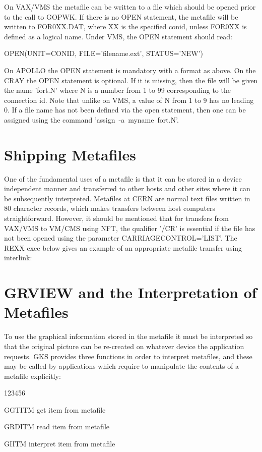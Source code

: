 On VAX/VMS the metafile can be written to a file which should be opened
prior to the call to GOPWK. If there is no OPEN statement, the metafile will
be written to FOR0XX.DAT, where XX is the specified conid, unless
FOR0XX is defined as a logical name.
Under VMS, the OPEN statement should read:
\begin{XMP}
OPEN(UNIT=CONID, FILE='filename.ext', STATUS='NEW')
\end{XMP}
 
On APOLLO the OPEN statement is mandatory with a format as above.
On the CRAY the OPEN statement is optional. If it is missing, then
the file will be given the name 'fort.N' where N is a number from 1 to
99 corresponding to the connection id. Note that unlike on VMS,
a value of N from 1 to 9 has no leading 0.
If a file name has not been defined via the open statement, then one can
be assigned using the command 'assign~-a~myname~fort.N'.
\section{Shipping Metafiles}
 
One of the fundamental uses of a metafile is that it can
be stored in a device independent manner and transferred to
other hosts and other sites where it can be subsequently interpreted.
Metafiles at CERN are normal text files written in 80 character records,
which makes transfers between host computers straightforward.
However, it should be mentioned that for transfers from VAX/VMS to VM/CMS
using NFT, the qualifier '/CR' is essential if the file has not been
opened using the parameter CARRIAGECONTROL='LIST'.
The REXX exec below gives an example of an appropriate metafile transfer
using interlink:
\section{GRVIEW and the Interpretation of Metafiles}
 
To use the graphical information stored in the metafile it must be
interpreted so that the original picture can be re-created on whatever
device the application requests.
GKS provides three functions in order to interpret metafiles,
and these may be called by applications which require to manipulate
the contents of a metafile explicitly:
\begin{DLtt}{123456}
\item[GGTITM]get item from metafile
\item[GRDITM]read item from metafile
\item[GIITM]interpret item from metafile
\end{DLtt}
 
